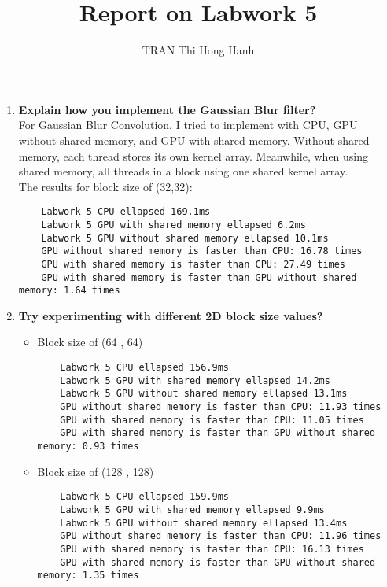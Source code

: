 \documentclass{article}
\title{Report on Labwork 5}
\author{TRAN Thi Hong Hanh}
\begin{document}
\maketitle
\begin{enumerate}
    \item \textbf{Explain how you implement the Gaussian Blur filter?}\\
    
    For Gaussian Blur Convolution, I tried to implement with CPU, GPU without shared memory, and GPU with shared memory.
    Without shared memory, each thread stores its own kernel array. Meanwhile, when using shared memory, all threads in a block using one shared kernel array.\\
    
    The results for block size of (32,32):
    
    \begin{verbatim}
    Labwork 5 CPU ellapsed 169.1ms
    Labwork 5 GPU with shared memory ellapsed 6.2ms
    Labwork 5 GPU without shared memory ellapsed 10.1ms
    GPU without shared memory is faster than CPU: 16.78 times
    GPU with shared memory is faster than CPU: 27.49 times
    GPU with shared memory is faster than GPU without shared memory: 1.64 times
    \end{verbatim}
    
    \item \textbf{Try experimenting with different 2D block size values?}\\
    \begin{itemize}
    
    \item Block size of (64 , 64)
    \begin{verbatim}
    Labwork 5 CPU ellapsed 156.9ms
    Labwork 5 GPU with shared memory ellapsed 14.2ms
    Labwork 5 GPU without shared memory ellapsed 13.1ms
    GPU without shared memory is faster than CPU: 11.93 times
    GPU with shared memory is faster than CPU: 11.05 times
    GPU with shared memory is faster than GPU without shared memory: 0.93 times            
    \end{verbatim}
    
    \item Block size of (128 , 128)
    \begin{verbatim}
    Labwork 5 CPU ellapsed 159.9ms
    Labwork 5 GPU with shared memory ellapsed 9.9ms
    Labwork 5 GPU without shared memory ellapsed 13.4ms
    GPU without shared memory is faster than CPU: 11.96 times
    GPU with shared memory is faster than CPU: 16.13 times
    GPU with shared memory is faster than GPU without shared memory: 1.35 times
    \end{verbatim}
    
    \end{itemize}

\end{enumerate}
\end{document}
